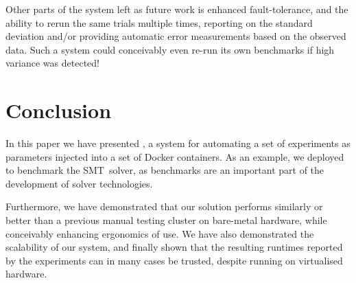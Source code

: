 \documentclass[a4paper]{IEEEtran}
\begin{document}
Other parts of the system left as future work is enhanced fault-tolerance, and
the ability to rerun the same trials multiple times, reporting on the standard
deviation and/or providing automatic error measurements based on the observed
data. Such a system could conceivably even re-run its own benchmarks if high
variance was detected!

\section{Conclusion}

In this paper we have presented \testbench{}, a system for automating a set of
experiments as parameters injected into a set of Docker containers. As an
example, we deployed \testbench{} to benchmark the \uppsat{} SMT~solver, as
benchmarks are an important part of the development of solver technologies.

Furthermore, we have demonstrated that our solution performs similarly or better
than a previous manual testing cluster on bare-metal hardware, while conceivably
enhancing ergonomics of use. We have also demonstrated the scalability of our
system, and finally shown that the resulting runtimes reported by the
experiments can in many cases be trusted, despite running on virtualised
hardware.

\printbibliography
\end{document}

